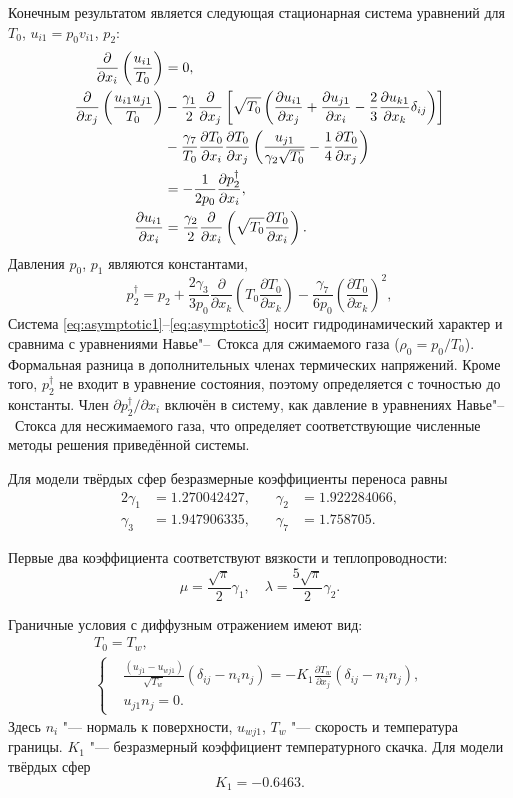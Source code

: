 \documentclass[english,russian,a4paper,10pt]{article}
\newcommand{\pder}[2][]{\frac{\partial#1}{\partial#2}}
\begin{document}
Конечным результатом является следующая стационарная система уравнений для \(T_0\), \(u_{i1} = p_0v_{i1}\), \(p_2\):
\begin{align}
	\pder{x_i}\left(\frac{u_{i1}}{T_0}\right) &= 0, \label{eq:asymptotic1} \\
	\pder{x_j}\left(\frac{u_{i1}u_{j1}}{T_0}\right)
		&-\frac{\gamma_1}2\pder{x_j}\left[\sqrt{T_0}\left(
			\pder[u_{i1}]{x_j}+\pder[u_{j1}]{x_i}-\frac23\pder[u_{k1}]{x_k}\delta_{ij}\right
		)\right] \notag\\
		&- \frac{\gamma_7}{T_0}\pder[T_0]{x_i}\pder[T_0]{x_j}\left(\frac{u_{j1}}{\gamma_2\sqrt{T_0}} - \frac{1}4\pder[T_0]{x_j}\right) \notag\\
		&= -\frac1{2p_0}\pder[p_2^\dag]{x_i}, \label{eq:asymptotic2} \\
	\pder[u_{i1}]{x_i} &= \frac{\gamma_2}2\pder{x_i}\left(\sqrt{T_0}\pder[T_0]{x_i}\right). \label{eq:asymptotic3}
\end{align}
Давления \(p_0\), \(p_1\) являются константами,
\[ 
	p_2^\dag = p_2 + 
		\frac{2\gamma_3}{3p_0}\pder{x_k}\left(T_0\pder[T_0]{x_k}\right) -
		\frac{\gamma_7}{6p_0}\left(\pder[T_0]{x_k}\right)^2,
\]
Система \eqref{eq:asymptotic1}--\eqref{eq:asymptotic3} носит гидродинамический характер
и сравнима с уравнениями Навье"--~Стокса для сжимаемого газа (\(\rho_0 = p_0/T_0\)).
Формальная разница в дополнительных членах термических напряжений.
Кроме того, \(p_2^\dag\) не входит в уравнение состояния, поэтому определяется с точностью до константы.
Член \(\partial{p_2^\dag}/\partial{x_i}\) включён в систему,
как давление в уравнениях Навье"--~Стокса для несжимаемого газа,
что определяет соответствующие численные методы решения приведённой системы.

Для модели твёрдых сфер безразмерные коэффициенты переноса равны
\begin{alignat*}{2}
	\gamma_1 &= 1.270042427, &\quad \gamma_2 &= 1.922284066, \\
	\gamma_3 &= 1.947906335, &\quad \gamma_7 &= 1.758705.
\end{alignat*}

Первые два коэффициента соответствуют вязкости и теплопроводности:
\[ \mu = \frac{\sqrt\pi}2\gamma_1, \quad \lambda = \frac{5\sqrt\pi}2\gamma_2. \]

Граничные условия с диффузным отражением имеют вид:
\begin{gather}
	T_0 = T_w, \label{eq:bound:T} \\
	\left\{
	\begin{aligned}
		& \frac{(u_{j1}-u_{wj1})}{\sqrt{T_w}}(\delta_{ij}-n_in_j) = 
			-K_1\pder[T_w]{x_j}(\delta_{ij}-n_in_j), \\
		& u_{j1}n_j = 0.
	\end{aligned}
	\right. \label{eq:bound:v}
\end{gather}
Здесь \(n_i\) "--- нормаль к поверхности, \(u_{wj1}\), \(T_w\) "--- скорость и температура границы.
\(K_1\) "--- безразмерный коэффициент температурного скачка. Для модели твёрдых сфер 
\[ K_1 = -0.6463. \]
\end{document}
